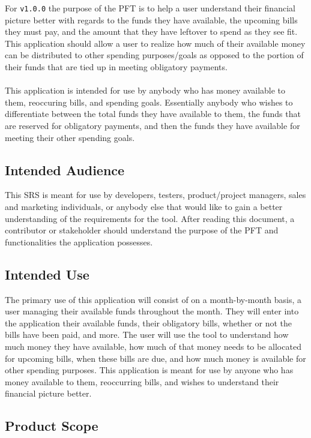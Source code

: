 \documentclass{article}
\begin{document}
For \texttt{v1.0.0} the purpose of the PFT is to help a user understand their financial picture better with regards to the funds they have available, the upcoming bills they must pay, and the amount that they have leftover to spend as they see fit.
This application should allow a user to realize how much of their available money can be distributed to other spending purposes/goals as opposed to the portion of their funds that are tied up in meeting obligatory payments. \\
\\
This application is intended for use by anybody who has money available to them, reoccuring bills, and spending goals. Essentially anybody who wishes to differentiate between
the total funds they have available to them, the funds that are reserved for obligatory payments, and then the funds they have available for meeting their other spending goals. 

\subsection{Intended Audience}

This SRS is meant for use by developers, testers, product/project managers, sales and marketing individuals, or anybody else that would like to gain a better understanding of the requirements for the tool. After reading this document, a contributor or stakeholder should understand
the purpose of the PFT and functionalities the application possesses.

\subsection{Intended Use}

The primary use of this application will consist of on a month-by-month basis, a user managing their available funds throughout the month. They will enter into the application their available funds, their obligatory bills, whether or not the bills have been paid, and more.
The user will use the tool to understand how much money they have available, how much of that money needs to be allocated for upcoming bills, when these bills are due, and how much money is available for other spending purposes.
This application is meant for use by anyone who has money available to them, reoccurring bills, and wishes to understand their financial picture better.

\subsection{Product Scope}
\end{document}
